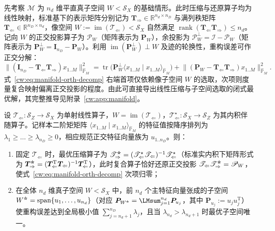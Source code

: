 先考察 $\mathcal M$ 为 $n_d$ 维平直真子空间 $W<\mathcal S_X$ 的基础情形。此时压缩与还原算子均为线性映射，标准基下的表示矩阵分别记为 $\bm T_{\Rightarrow}\in\mathbb R^{n_d\times n_D}$ 与满列秩矩阵 $\bm T_{\Leftarrow}\in\mathbb R^{n_D\times n_d}$，像空间 $W:=\operatorname{im}(\mathscr T_{\Leftarrow})<\mathcal S_X$ 自然满足 $\operatorname{rank}(\bm T_{\Leftarrow}\bm T_{\Rightarrow})\le n_d$。记向 $W$ 的正交投影算子为 $\mathscr P_W$（矩阵表示为 $\bm P_W$），余投影为 $\mathscr P_W^{\perp}=\mathscr I-\mathscr P_W$（矩阵表示为 $\bm P_W^{\perp}=\bm I_{n_D}-\bm P_W$）。利用 $\operatorname{im}(\bm P_W^{\perp})\perp W$ 及迹的轮换性，重构误差可作正交分解：
\begin{equation}\label{cw:eq:manifold-orth-decomp}
\bigl\|(\bm I_{n_D}-\bm T_{\Leftarrow}\bm T_{\Rightarrow})x_{1..M}\bigr\|_{\hat{\mathbb P}_M}^2
=\operatorname{tr}\bigl(\bm P_W^{\perp}\langle x_{1..M}\mid x_{1..M}\rangle_{\hat{\mathbb P}_M}\bigr)
+\bigl\|(\bm P_W-\bm T_{\Leftarrow}\bm T_{\Rightarrow})x_{1..M}\bigr\|_{\hat{\mathbb P}_M}^2.
\end{equation}
式~\eqref{cw:eq:manifold-orth-decomp} 右端首项仅依赖像子空间 $W$ 的选取，次项则度量复合映射偏离正交投影的程度。由此可直接导出线性压缩与子空间选取的闭式最优解，其完整推导见附录~\ref{cw:app:manifold}。

\begin{proposition}[线性压缩还原的伴随闭式解与谱截断]\label{cw:prop:linear-manifold}
设 $\mathscr T_{\Leftarrow}:\mathcal S_Z\to\mathcal S_X$ 为单射线性算子，$W=\operatorname{im}(\mathscr T_{\Leftarrow})$，$\mathscr T_{\Leftarrow}^{\star}:\mathcal S_X\to\mathcal S_Z$ 为其内积伴随算子。记样本二阶矩矩阵 $\langle x_{1..M}\mid x_{1..M}\rangle_{\hat{\mathbb P}_M}$ 的特征值按降序排列为 $\lambda_1\ge\dots\ge\lambda_{n_D}\ge0$，相应规范正交特征向量族为 $u_{1..n_D}$。则：
\begin{enumerate}[label=(\arabic*),leftmargin=2.2em,topsep=2pt,itemsep=2pt]
\item 固定 $\mathscr T_{\Leftarrow}$ 时，最优压缩算子为 $\mathscr T_{\Rightarrow}^{\optstar}=(\mathscr T_{\Leftarrow}^{\star}\mathscr T_{\Leftarrow})^{-1}\mathscr T_{\Leftarrow}^{\star}$（标准实内积下矩阵形式为 $\bm T_{\Rightarrow}^{\optstar}=(\bm T_{\Leftarrow}^{\mathrm T}\bm T_{\Leftarrow})^{-1}\bm T_{\Leftarrow}^{\mathrm T}$），此时复合算子恰好还原正交投影 $\mathscr T_{\Leftarrow}\mathscr T_{\Rightarrow}^{\optstar}=\mathscr P_W$，使式~\eqref{cw:eq:manifold-orth-decomp} 次项归零；
\item 在全体 $n_d$ 维真子空间 $W<\mathcal S_X$ 中，前 $n_d$ 个主特征向量张成的子空间 $W^{\optstar}=\operatorname{span}\{u_1,\dots,u_{n_d}\}$（对应 $\bm P_{W^{\optstar}}=\sum_{j=1}^{n_d}\bm P_{u_j}$，其中 $\bm P_{u_j}:=u_ju_j^{\mathrm T}$）使重构误差达到全局极小值 $\sum_{j=n_d+1}^{n_D}\lambda_j$，且当 $\lambda_{n_d}>\lambda_{n_d+1}$ 时最优子空间唯一。
\end{enumerate}
\end{proposition}

